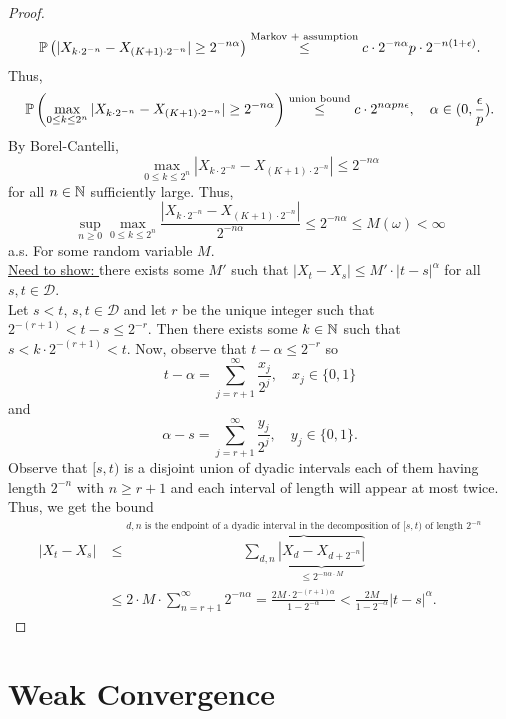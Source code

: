 \documentclass{article}
\begin{document}
\begin{proof}
\[
	\mathbb{P} \left( |X_{k\cdot 2^{-n}}-X_{(K+1)\cdot 2^{-n}}| \geq 2^{-n\alpha}\right)\stackrel{\text{Markov + assumption}}{\leq} c\cdot 2^{-n\alpha}p\cdot2^{-n(1+\epsilon)}. 
\]
Thus, 
\[
	\mathbb{P} \left( \max_{0\leq k \leq 2^n}|X_{k\cdot 2^{-n}}-X_{(K+1)\cdot 2^{-n}}| \geq 2^{-n\alpha} \right)\stackrel{\text{union bound}}{\leq} c\cdot 2^{n\alpha p n\epsilon}, \quad \alpha \in (0, \frac{\epsilon}{p}).   
\]
By Borel-Cantelli, 
\[
\max_{0\leq k \leq 2^n}|X_{k\cdot 2^{-n}}-X_{(K+1)\cdot 2^{-n}}| \leq 2^{-n\alpha}
\]
for all $ n\in \mathbb{N}$ sufficiently large. Thus, 
\[
 \displaystyle\sup_{ n\geq 0}\max_{0\leq k \leq 2^n} \frac{ |X_{k\cdot 2^{-n}}-X_{(K+1)\cdot 2^{-n}}|}{2^{-n\alpha}} \leq 2^{-n\alpha}\leq M(\omega)<\infty
\]
a.s. For some random variable $ M$. \\ 

\underline{Need to show: } there exists some $ M'$ such that $ |X_{t}-X_{s}|\leq M'\cdot |t-s|^{\alpha}$ for all $ s,t \in \mathcal{D}$.\\ 

Let $ s<t$, $ s,t\in \mathcal{D}$ and let $ r$ be the unique integer such that $ 2^{-(r+1)}<t-s\leq 2^{-r}$. Then there exists some $ k\in \mathbb{N}$ such that $ s<k\cdot 2^{-(r+1)}<t$. Now, observe that $ t-\alpha\leq 2^{-r}$ so 
\[
	t-\alpha = \displaystyle\sum^{\infty}_{j=r+1} \frac{x_{j}}{2^j}, \quad x_{j}\in \{0,1\}
\]
and 
\[
	\alpha-s = \displaystyle\sum^{\infty}_{j=r+1} \frac{y_{j}}{2^j}, \quad y_{j}\in \{0,1\}.

\]
Observe that $ [s, t)$ is a disjoint union of dyadic intervals each of them having length $ 2^{-n}$ with $ n\geq r+1$ and each interval of length will appear at most twice. Thus, we get the bound
\[
\begin{array}{ll}
|X_{t}-X_{s}| &\leq\displaystyle\overbrace{\sum_{d,n}\displaystyle\underbrace{|X_d-X_{d+2^{-n}}|}_{\leq 2^{-n\alpha\cdot M}}}^{d,n \text{ is the endpoint of a dyadic interval in the decomposition of }[s,t) \text{ of length } 2^{-n}}  \\
	      &\leq 2\cdot M \cdot\displaystyle\sum^{\infty}_{n =  r+1} 2^{-n\alpha} = \frac{2M\cdot 2^{-(r+1)\alpha}}{1-2^{-\alpha}} < \frac{2M}{1-2^{-\alpha}}|t-s|^{\alpha}.
\end{array}
\]
\end{proof}

\section{Weak Convergence}\label{sec: weak convergence}
\end{document}
